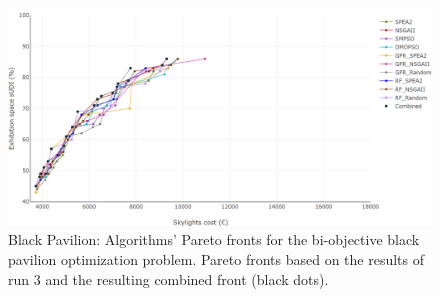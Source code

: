 \begin{figure}[h!]
	\centering
	\includegraphics[width=\textwidth]{Images/Evaluation/BlackPavilion/All_Algorithms_run3-2019-04-19_2.png}
	\caption[Black Pavilion: Pareto Fronts for run 3]{Black Pavilion: Algorithms' Pareto fronts for the bi-objective black pavilion optimization problem. Pareto fronts based on the results of run $3$ and the resulting combined front (black dots).}
	\label{table:blackpavilionrun3}
\end{figure}
